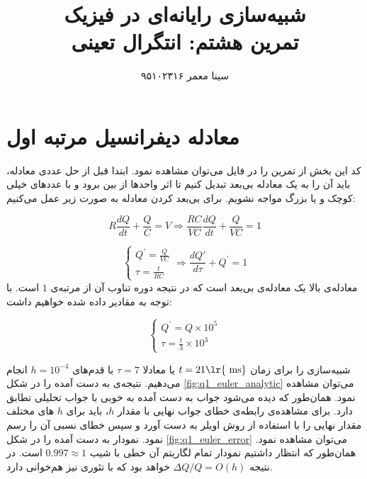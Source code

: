 \documentclass[11pt, a4paper]{article}
\title{\textbf{شبیه‌سازی رایانه‌ای در فیزیک}\\تمرین هشتم: انتگرال تعینی}
\author{سینا معمر ۹۵۱۰۲۳۱۶}
\begin{document}
\maketitle
\thispagestyle{empty}


\section{\textbf{معادله دیفرانسیل مرتبه اول}}
کد این بخش از تمرین را در فایل
می‌توان مشاهده نمود.
ابتدا قبل از حل عددی معادله،
باید آن را به یک معادله بی‌بعد تبدیل کنیم تا اثر واحد‌ها از بین برود و با عدد‌های خیلی کوچک و یا بزرگ مواجه نشویم.
برای بی‌بعد کردن معادله به صورت زیر عمل می‌کنیم:

\begin{equation}
  R \frac{dQ}{dt} + \frac{Q}{C} = V
  \Rightarrow
  \frac{RC}{VC} \frac{dQ}{dt} + \frac{Q}{VC} = 1
\end{equation}

\begin{equation}
  \begin{cases}
    Q^{'} = \frac{Q}{VC} \\
    \tau = \frac{t}{RC}
  \end{cases}
  \Rightarrow
  \frac{dQ{'}}{d\tau} + Q^{'} = 1
  \label{eqn:q1_nondim_eqn}
\end{equation}
معادله‌ی بالا یک معادله‌ی بی‌بعد است که در نتیجه دوره تناوب آن از مرتبه‌ی
$1$
است.
با توجه به مقادیر داده شده خواهیم داشت:

\begin{equation}
  \begin{cases}
    Q^{'} = Q \times 10^5 \\
    \tau = \frac{t}{3} \times 10^3
  \end{cases}
\end{equation}

شبیه‌سازی را برای زمان
$t = 21 \text{\lr{ ms}}$
یا معادلا
$\tau = 7$
با قدم‌های
$h = 10^{-4}$
انجام می‌دهیم.
نتیجه‌ی به دست آمده را در شکل
\ref{fig:q1_euler_analytic}
می‌توان مشاهده نمود.
همان‌طور که دیده می‌شود جواب به دست آمده به خوبی با جواب تحلیلی تطابق دارد.
برای مشاهده‌ی رابطه‌ی خطای جواب نهایی با مقدار
$h$،
باید برای
$h$
های مختلف مقدار نهایی را با استفاده از روش اویلر به دست آورد و سپس خطای نسبی آن را رسم نمود.
نمودار به دست آمده را در شکل
\ref{fig:q1_euler_error}
می‌توان مشاهده نمود.
همان‌طور که انتظار داشتیم نمودار تمام لگاریتم آن خطی با شیب
$0.997 \approx 1$
است.
در نتیجه
$\Delta Q / Q = O(h)$
خواهد بود که با تئوری نیز هم‌خوانی دارد.
\end{document}
